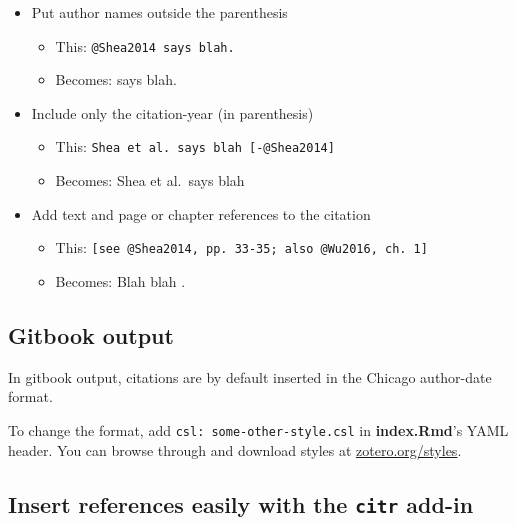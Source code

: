 \documentclass[a4paper, nobind]{templates/ociamthesis}
\providecommand{\tightlist}{%
  \setlength{\itemsep}{0pt}\setlength{\parskip}{0pt}}
\begin{document}
\begin{itemize}
\tightlist
\item
  Put author names outside the parenthesis

  \begin{itemize}
  \tightlist
  \item
    This: \texttt{@Shea2014\ says\ blah.}
  \item
    Becomes: \textcite{Shea2014} says blah.
  \end{itemize}
\item
  Include only the citation-year (in parenthesis)

  \begin{itemize}
  \tightlist
  \item
    This: \texttt{Shea\ et\ al.\ says\ blah\ {[}-@Shea2014{]}}
  \item
    Becomes: Shea et al.~says blah \autocite*{Shea2014}
  \end{itemize}
\item
  Add text and page or chapter references to the citation

  \begin{itemize}
  \tightlist
  \item
    This: \texttt{{[}see\ @Shea2014,\ pp.\ 33-35;\ also\ @Wu2016,\ ch.\ 1{]}}
  \item
    Becomes: Blah blah \autocites[see][pp.~33-35]{Shea2014}[also][ch.~1]{Wu2016}.
  \end{itemize}
\end{itemize}

\hypertarget{gitbook-output}{%
\subsection{Gitbook output}\label{gitbook-output}}

In gitbook output, citations are by default inserted in the Chicago author-date format.

To change the format, add \texttt{csl:\ some-other-style.csl} in \textbf{index.Rmd}'s YAML header.
You can browse through and download styles at \href{https://www.zotero.org/styles}{zotero.org/styles}.

\clearpage

\hypertarget{insert-references-easily-with-the-citr-add-in}{%
\subsection{\texorpdfstring{Insert references easily with the \texttt{citr} add-in}{Insert references easily with the citr add-in}}\label{insert-references-easily-with-the-citr-add-in}}
\end{document}
